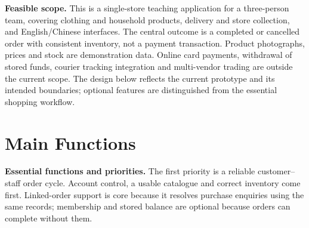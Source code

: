 \textbf{Feasible scope.} This is a single-store teaching application for a three-person team, covering clothing and household products, delivery and store collection, and English/Chinese interfaces. The central outcome is a completed or cancelled order with consistent inventory, not a payment transaction. Product photographs, prices and stock are demonstration data. Online card payments, withdrawal of stored funds, courier tracking integration and multi-vendor trading are outside the current scope. The design below reflects the current prototype and its intended boundaries; optional features are distinguished from the essential shopping workflow.

\newpage
\section{Main Functions}
\textbf{Essential functions and priorities.} The first priority is a reliable customer--staff order cycle. Account control, a usable catalogue and correct inventory come first. Linked-order support is core because it resolves purchase enquiries using the same records; membership and stored balance are optional because orders can complete without them.
